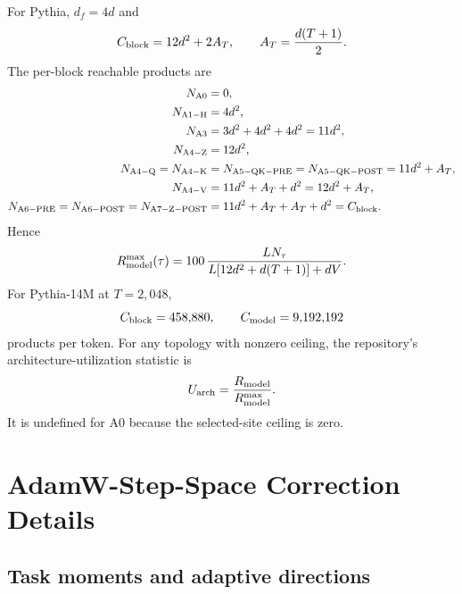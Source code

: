 For Pythia, $d_f=4d$ and
\begin{equation}
    C_{\mathrm{block}}=12d^2+2A_T,
    \qquad A_T=\frac{d(T+1)}{2}.
    \label{eq:block-cost-at}
\end{equation}
The per-block reachable products are
\begin{align*}
    N_{\mathrm{A0}}&=0,\\
    N_{\mathrm{A1-H}}&=4d^2,\\
    N_{\mathrm{A3}}&=3d^2+4d^2+4d^2=11d^2,\\
    N_{\mathrm{A4-Z}}&=12d^2,\\
    N_{\mathrm{A4-Q}}=N_{\mathrm{A4-K}}
      &=N_{\mathrm{A5-QK-PRE}}=N_{\mathrm{A5-QK-POST}}
        =11d^2+A_T,\\
    N_{\mathrm{A4-V}}&=11d^2+A_T+d^2=12d^2+A_T,\\
    N_{\mathrm{A6-PRE}}=N_{\mathrm{A6-POST}}
      =N_{\mathrm{A7-Z-POST}}
      &=11d^2+A_T+A_T+d^2=C_{\mathrm{block}}.
\end{align*}
Hence
\begin{equation}
    R_{\mathrm{model}}^{\max}(\tau)
      =100\,
       \frac{L N_\tau}
            {L[12d^2+d(T+1)]+dV}.
    \label{eq:closed-form-ceiling}
\end{equation}
For Pythia-14M at $T=2{,}048$,
\begin{equation}
    C_{\mathrm{block}}=458{,}880,
    \qquad
    C_{\mathrm{model}}=9{,}192{,}192
    \label{eq:14m-denominators}
\end{equation}
products per token. For any topology with nonzero ceiling, the repository's
architecture-utilization statistic is
\begin{equation}
    U_{\mathrm{arch}}
      =\frac{R_{\mathrm{model}}}{R_{\mathrm{model}}^{\max}}.
    \label{eq:architecture-utilization}
\end{equation}
It is undefined for A0 because the selected-site ceiling is zero.

\section{AdamW-Step-Space Correction Details}
\label{app:adam-details}

\subsection{Task moments and adaptive directions}

